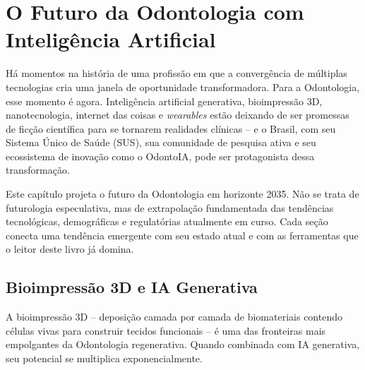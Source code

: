 \chapter{O Futuro da Odontologia com Inteligência Artificial}
\label{cap:futuro-odontologia}

\nivelquatro

Há momentos na história de uma profissão em que a convergência de múltiplas
tecnologias cria uma janela de oportunidade transformadora. Para a Odontologia,
esse momento é agora. Inteligência artificial generativa, bioimpressão 3D,
nanotecnologia, internet das coisas e \textit{wearables} estão deixando de ser
promessas de ficção científica para se tornarem realidades clínicas -- e o
Brasil, com seu Sistema Único de Saúde (SUS), sua comunidade de pesquisa ativa
e seu ecossistema de inovação como o OdontoIA, pode ser protagonista dessa
transformação.

Este capítulo projeta o futuro da Odontologia em horizonte 2035. Não se trata
de futurologia especulativa, mas de extrapolação fundamentada das tendências
tecnológicas, demográficas e regulatórias atualmente em curso. Cada seção
conecta uma tendência emergente com seu estado atual e com as ferramentas que
o leitor deste livro já domina.

 
 

\section{Bioimpressão 3D e IA Generativa}
\label{sec:bioimpressao}

\nivelcinco

A bioimpressão 3D -- deposição camada por camada de biomateriais contendo
células vivas para construir tecidos funcionais -- é uma das fronteiras mais
empolgantes da Odontologia regenerativa. Quando combinada com IA generativa, seu
potencial se multiplica exponencialmente.


